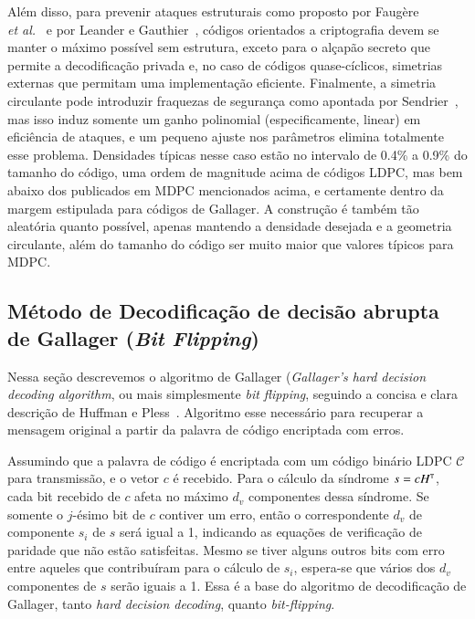 \documentclass{SBCbookchapter}
\newcommand{\tp}{\textrm{\tiny T}}
\begin{document}
\begin{otherlanguage}{brazilian}
Além disso, para prevenir ataques estruturais como proposto por Faug\`{e}re \\\emph{et al.}~\cite{faugere-otmani-perret-tillich} e por Leander e Gauthier~\cite{gauthier-leander}, códigos orientados a criptografia devem se manter o máximo possível sem estrutura, exceto para o alçapão secreto que permite a decodificação privada e, no caso de códigos quase-cíclicos, simetrias externas que permitam uma implementação eficiente. Finalmente, a simetria circulante pode introduzir fraquezas de segurança como apontada por Sendrier~\cite{sendrier-doom}, mas isso induz somente um ganho polinomial (especificamente, linear) em eficiência de ataques, e um pequeno ajuste nos parâmetros elimina totalmente esse problema. Densidades típicas nesse caso estão no intervalo de 0.4\% a 0.9\% do tamanho do código, uma ordem de magnitude acima de códigos LDPC, mas bem abaixo dos publicados em MDPC mencionados acima, e certamente dentro da margem estipulada para códigos de Gallager. A construção é também tão aleatória quanto possível, apenas mantendo a densidade desejada e a geometria circulante, além do tamanho do código ser muito maior que valores típicos para MDPC.

\subsection{Método de Decodificação de decisão abrupta de Gallager (\emph{Bit Flipping})}\label{subsec:hdd-recap}

Nessa seção descrevemos o algoritmo de Gallager (\emph{Gallager's hard decision decoding algorithm}, ou mais simplesmente \emph{bit flipping}, seguindo a concisa e clara descrição de Huffman e Pless~\cite{huffman-pless}. Algoritmo esse necessário para recuperar a mensagem original a partir da palavra de código encriptada com erros.

Assumindo que a palavra de código é encriptada com um código binário LDPC $\mathscr{C}$ para transmissão, e o vetor $c$ é recebido. Para o cálculo da síndrome $s = c H^{\tp}$, cada bit recebido de $c$ afeta no máximo $d_v$ componentes dessa síndrome. Se somente o $j$-ésimo bit de $c$ contiver um erro, então o correspondente $d_v$ de componente $s_i$ de $s$ será igual a 1, indicando as equações de verificação de paridade que não estão satisfeitas. Mesmo se tiver alguns outros bits com erro entre aqueles que contribuíram para o cálculo de $s_i$, espera-se que vários dos $d_v$ componentes de $s$ serão iguais a 1. Essa é a base do algoritmo de decodificação de Gallager, tanto \textit{hard decision decoding}, quanto \textit{bit-flipping}.


\end{otherlanguage}
\end{document}
